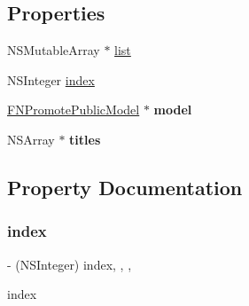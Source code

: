 \subsection*{Properties}
\begin{DoxyCompactItemize}
\item 
N\+S\+Mutable\+Array $\ast$ \mbox{\hyperlink{interface_f_n_mine_promote_view_model_a9c4441010055c4dbd95efd6a0e49e560}{list}}
\item 
N\+S\+Integer \mbox{\hyperlink{interface_f_n_mine_promote_view_model_a05f84b3ebd799540bc161bcb4a17030b}{index}}
\item 
\mbox{\label{interface_f_n_mine_promote_view_model_a14f498b48e274853e7fdcbd6252aeb69}} 
\mbox{\hyperlink{interface_f_n_promote_public_model}{F\+N\+Promote\+Public\+Model}} $\ast$ {\bfseries model}
\item 
\mbox{\label{interface_f_n_mine_promote_view_model_a380f7ed90992db2284df24ac75a25721}} 
N\+S\+Array $\ast$ {\bfseries titles}
\end{DoxyCompactItemize}


\subsection{Property Documentation}
\mbox{\label{interface_f_n_mine_promote_view_model_a05f84b3ebd799540bc161bcb4a17030b}} 
\subsubsection{\texorpdfstring{index}{index}}
{\footnotesize\ttfamily -\/ (N\+S\+Integer) index\hspace{0.3cm}{\ttfamily [read]}, {\ttfamily [write]}, {\ttfamily [nonatomic]}, {\ttfamily [assign]}}

index \mbox{\label{interface_f_n_mine_promote_view_model_a9c4441010055c4dbd95efd6a0e49e560}} 
